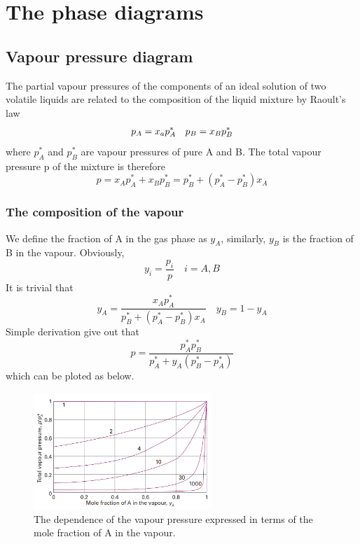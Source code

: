 \section{The phase diagrams}
\subsection{Vapour pressure diagram}
The partial vapour pressures of the components of an ideal solution of two volatile liquids are related to the composition of the liquid mixture by Raoult's law
\begin{align}
    \begin{split}\notag
        p_A=x_ap_A^*\quad p_B=x_Bp_B^*
    \end{split}
\end{align}
where $p_A^*$ and $p_B^*$ are vapour pressures of pure A and B. The total vapour pressure p of the mixture is therefore
$$p=x_Ap_A^*+x_Bp_B^*=p_B^*+(p_A^*-p_B^*)x_A$$
\subsubsection{The composition of the vapour}
We define the fraction of A in the gas phase as $y_A$, similarly, $y_B$ is the fraction of B in the vapour. Obviously,
$$y_i=\frac{p_i}{p}\quad i=A,B$$
It is trivial that
$$y_A=\frac{x_Ap_A^*}{p_B^*+(p_A^*-p_B^*)x_A}\quad y_B=1-y_A$$
Simple derivation give out that
$$p=\frac{p_A^*p_B^*}{p_A^*+y_A(p_B^*-p_A^*)}$$
which can be ploted as below.
\begin{figure}[H]
    \setlength{\abovecaptionskip}{0.5pt}
    \centering
    \includegraphics[width=0.6\textwidth]{"./fig/f1.png"}
    \caption{The dependence of the vapour pressure expressed in terms of the mole 
    fraction of A in the vapour.}
\end{figure}
